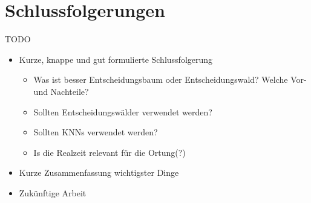 \chapter{Schlussfolgerungen}
TODO\cite{SAMPLE}

\begin{itemize}
    \item Kurze, knappe und gut formulierte Schlussfolgerung
    \begin{itemize}
        \item Was ist besser Entscheidungsbaum oder Entscheidungswald? Welche Vor- und Nachteile?
        \item Sollten Entscheidungswälder verwendet werden?
        \item Sollten KNNs verwendet werden?
        \item Is die Realzeit relevant für die Ortung(?)
    \end{itemize}
    \item Kurze Zusammenfassung wichtigster Dinge
    \item Zukünftige Arbeit
\end{itemize}
